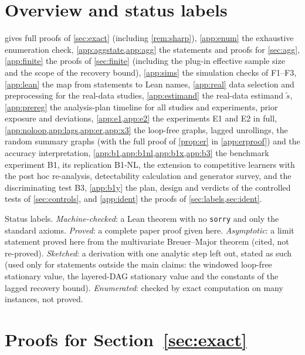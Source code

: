 
\section{Overview and status labels}
\label{app:overview}
 gives full proofs of \cref{sec:exact} (including
\cref{rem:sharp}), \cref{app:enum} the exhaustive enumeration check,
\cref{app:aggstate,app:agg} the statements and proofs for \cref{sec:agg}, \cref{app:finite} the proofs of
\cref{sec:finite} (including the plug-in effective sample size and the scope
of the recovery bound), \cref{app:sims} the simulation checks of F1--F3,
\cref{app:lean} the map from statements to Lean names, \cref{app:real} data
selection and preprocessing for the real-data studies, \cref{app:estimand}
the real-data estimand $\tilde s$, \cref{app:prereg} the analysis-plan
timeline for all studies and experiments, prior exposure and deviations,
\cref{app:e1,app:e2} the experiments E1 and E2 in full,
\cref{app:noloop,app:lags,app:er,app:x3} the loop-free graphs, lagged
unrollings, the random summary graphs (with the full proof of \cref{prop:er}
in \cref{app:erproof}) and the accuracy interpretation,
\cref{app:b1,app:b1nl,app:b1x,app:b3} the benchmark experiment B1, its
replication B1-NL, the extension to competitive learners with the post hoc
re-analysis, detectability calculation and generator survey, and the
discriminating test B3, \cref{app:b1y} the plan, design and verdicts of the
controlled tests of \cref{sec:controls}, and \cref{app:ident} the proofs of
\cref{sec:labels,sec:ident}.

Status labels. \emph{Machine-checked}: a Lean theorem with no \texttt{sorry}
and only the standard axioms. \emph{Proved}: a complete paper proof given
here. \emph{Asymptotic}: a limit statement proved here from the multivariate
Breuer--Major theorem \citep{arcones1994limit,nourdin2011quantitative} (cited, not
re-proved). \emph{Sketched}: a derivation with one analytic step left out,
stated as such (used only for statements outside the main claims: the windowed
loop-free stationary value, the layered-DAG stationary value and the constants
of the lagged recovery bound).
\emph{Enumerated}: checked by exact computation on many instances, not proved.

\section{Proofs for Section~\ref{sec:exact}}
\label{app:exact}


